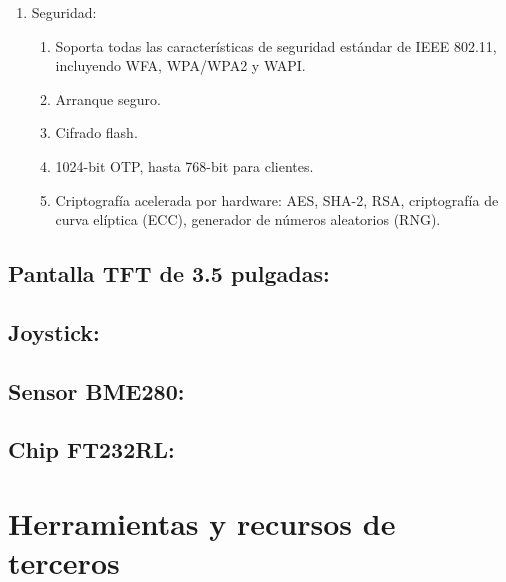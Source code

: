 \begin{enumerate}
\begin{enumerate}
	\end{enumerate}
	\item Seguridad:
	\begin{enumerate}
		\item Soporta todas las características de seguridad estándar de IEEE 802.11, incluyendo WFA, WPA/WPA2 y WAPI.
		\item Arranque seguro.
		\item Cifrado flash.
		\item 1024-bit OTP, hasta 768-bit para clientes.
		\item Criptografía acelerada por hardware: AES, SHA-2, RSA, criptografía de curva elíptica (ECC), generador de números aleatorios (RNG).
	\end{enumerate}	
\end{enumerate}



\subsection{Pantalla TFT de 3.5 pulgadas:}

\subsection{Joystick:}

\subsection{Sensor BME280:}

\subsection{Chip FT232RL:}

\section{Herramientas y recursos de terceros}

